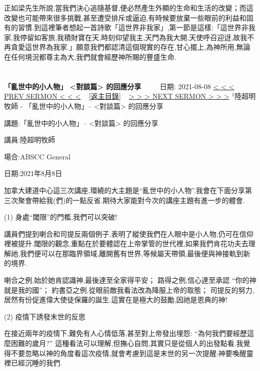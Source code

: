 \documentclass{book}
\begin{document}
正如梁先生所說,當我們決心追隨基督,便必然產生外顯的生命和生活的改變；而這改變也可能帶來很多挑戰,甚至遭受排斥或逼迫,有時候要放棄一些眼前的利益和固有的習慣.到這裡筆者想起一首詩歌「這世界非我家」,第一節是這樣:「這世界非我家,我停留如客旅,我積財寶在天,時刻仰望我主,天門為我大開,天使呼召迎迓,故我不再貪愛這世界為我家.」願意我們都認清這個現實的存在,甘心擺上,為神所用,無論在任何境況都尊主為大,我們就會經歷神所賜的豐盛生命.
\newpage



\section{}
\label{sec:5}
\textbf{「亂世中的小人物」 <對談篇> 的回應分享}
\newline
\newline
~~~~ 日期: 2021-08-08
\newline
\newline
\hyperref[sec:4]{\small{< < < PREV SERMON < < <}}
~
\hyperref[sec:index]{\small{[返主目錄]}}
~
\hyperref[sec:GA78znQ7bg4]{\small{> > > NEXT SERMON > > >}}
\newline
\newline
$^{1}$陸超明牧師 - 「亂世中的小人物」-- <對談篇> 的回應分享

講題:「亂世中的小人物」-- <對談篇> 的回應分享

講員:陸超明牧師

場合:ABSCC General

日期:2021年8月8日

加拿大建道中心這三次講座,環繞的大主題是“亂世中的小人物”.我會在下面分享第三次聚會帶給我(們)的一點反省.期待大家能對今次的講座主題有進一步的體會.

(1) 身處“閾限”的門檻,我們可以突破!

講員們提到喇合和司提反兩個例子,表明了縱使我們在人眼中是小人物,仍可在信仰裡被提升.閾限的觀念,重點在於要體認在上帝掌管的世代裡,如果我們肯花功夫去理解祂,我們便可以在那臨界領域,離開舊有世界,等候屬天帶領,最後便與神接軌到新的境界.

喇合之例,始於她肯認識神,最後達至全家得平安； 路得之例,信心達至承認 “你的神就是我的國”； 約書亞之例,從眼前敵我看法改為降服上帝的取態； 司提反的努力,居然有份促進偉大使徒保羅的誕生.這實在是極大的鼓勵,因祂是恩典的神!

(2) 疫情下誘發末世的反思

在接近兩年的疫情下,難免有人心情低落,甚至對上帝發出埋怨: “為何我們要經歷這麼困難的歲月?” 這種看法可以理解,但撫心自問,其實只是從個人的出發點看.我覺得不要忽略以神的角度看這次疫情,就會考慮到這是末世的另一次提醒:神要喚醒靈裡已經沉睡的我們.
\end{document}
